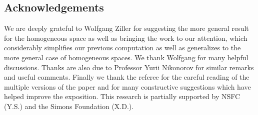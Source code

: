 \documentclass[pdftex]{sigma}
\begin{document}
\subsection*{Acknowledgements}

We are deeply grateful to Wolfgang Ziller for suggesting the more general result for the homogeneous space as well as bringing the work \cite{12} to our attention, which considerably simplifies our previous computation as well as generalizes to the more general case of homogeneous spaces. We thank Wolfgang for many helpful discussions. Thanks are also due to Professor Yurii Nikonorov for similar remarks and useful comments. Finally we thank the referee for the careful reading of the multiple versions of the paper and for many constructive suggestions which have helped improve the exposition. This research is partially supported by NSFC (Y.S.) and the Simons Foundation (X.D.).
\end{document}
